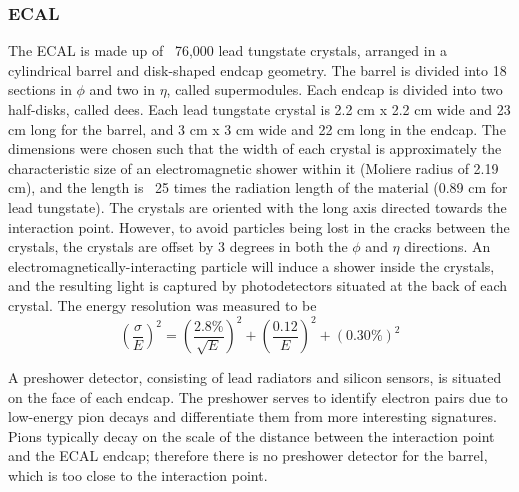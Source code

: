 \subsubsection{ECAL}
The ECAL is made up of ~76,000 lead tungstate crystals,
arranged in a cylindrical barrel and disk-shaped endcap geometry.  
The barrel is divided into 18 sections in $\phi$ and 
two in $\eta$, called supermodules.  
Each endcap is divided into two half-disks, called dees.  
Each lead tungstate crystal is 
2.2 cm x 2.2 cm wide and 23 cm long for the barrel, 
and 3 cm x 3 cm wide and 22 cm long in the endcap.  
The dimensions were chosen such that the width 
of each crystal is approximately the characteristic size of 
an electromagnetic shower within it 
(Moliere radius of 2.19 cm),
and the length is ~25 times the radiation length 
of the material (0.89 cm for lead tungstate).  
The crystals are oriented with the long axis
directed towards the interaction point.  
However, to avoid particles being lost in the cracks 
between the crystals,
the crystals are offset by 3 degrees in both the 
$\phi$ and $\eta$ directions.  
An electromagnetically-interacting particle will 
induce a shower inside the crystals, 
and the resulting light is captured by 
photodetectors situated at the back of each crystal.  
The energy resolution was measured to be 
\[
\left(\frac{\sigma}{E}\right)^2 = \left(\frac{2.8\%}{\sqrt{E}}\right)^2 + \left(\frac{0.12}{E}\right)^2 + \left(0.30\%\right)^2
\]

A preshower detector, consisting of lead radiators 
and silicon sensors, 
is situated on the face of each endcap.  
The preshower serves to identify electron pairs due to low-energy 
pion decays and differentiate them from more 
interesting signatures.  
Pions typically decay on the scale 
of the distance between the interaction point and the 
ECAL endcap;
therefore there is no preshower detector for the barrel, 
which is too close to the interaction point.  

